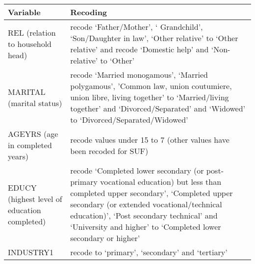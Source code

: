 \documentclass[letterpaper,10pt,english]{sphinxmanual}
\begin{document}
\begin{savenotes}\sphinxattablestart
\centering
{}
\label{\detokenize{case_studies:tab924}}\label{\detokenize{case_studies:id39}}
\sphinxaftercaption
\begin{tabulary}{\linewidth}[t]{|T|T|}
\hline
\sphinxstyletheadfamily 
Variable
&\sphinxstyletheadfamily 
Recoding
\\
\hline
REL (relation to household head)
&
recode ‘Father/Mother’, ‘
Grandchild’, ‘Son/Daughter in
law’, ‘Other relative’ to ‘Other
relative’ and recode ‘Domestic
help’ and ‘Non-relative’ to
‘Other’
\\
\hline
MARITAL (marital status)
&
recode ‘Married monogamous’,
‘Married polygamous’, ’Common
law, union coutumiere, union
libre, living together’ to
‘Married/living together’ and
‘Divorced/Separated’ and
‘Widowed’ to
‘Divorced/Separated/Widowed’
\\
\hline
AGEYRS (age in completed years)
&
recode values under 15 to 7
(other values have been recoded
for SUF)
\\
\hline
EDUCY (highest level of education completed)
&
recode ‘Completed lower secondary
(or post-primary vocational
education) but less than
completed upper secondary’,
‘Completed upper secondary (or
extended vocational/technical
education)’, ‘Post secondary
technical’ and ‘University and
higher’ to ‘Completed lower
secondary or higher’
\\
\hline
INDUSTRY1
&
recode to ‘primary’, ‘secondary’
and ‘tertiary’
\\
\hline
\end{tabulary}
\par
\sphinxattableend\end{savenotes}
\end{document}
